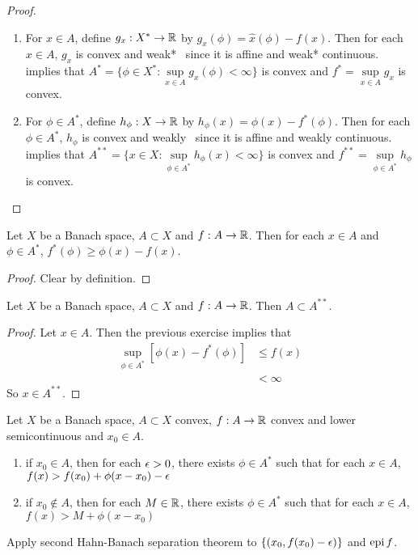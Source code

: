 \documentclass{book}
\begin{document}
	\begin{proof} \
		\begin{enumerate}
			\item For $x \in A$, define $g_x: X^* \rightarrow \mathbb{R}$ by $g_x(\phi) = \hat{x}(\phi) - f(x)$. Then for each $x \in A$, $g_x$ is convex and weak* \lsc \, since it is affine and weak* continuous.  implies that $A^* = \{\phi \in X^*: \sup\limits_{x \in A} g_x(\phi) < \infty \}$ is convex and  $f^* = \sup\limits_{x \in A} g_x$ is convex.
			\item For $\phi \in A^*$, define $h_{\phi}: X \rightarrow \mathbb{R}$ by $h_{\phi}(x) = \phi(x) - f^{*}(\phi)$. Then for each $\phi \in A^*$, $h_{\phi}$ is convex and weakly \lsc \, since it is affine and weakly continuous. \rex{91015} implies that $A^{**} = \{x \in X: \sup\limits_{\phi \in A^*} h_{\phi}(x) < \infty \}$ is convex and   $f^{**} = \sup\limits_{\phi \in A^*} h_{\phi}$ is convex. 
		\end{enumerate}		 
	\end{proof}
	
	\begin{ex} \lex{}
		Let $X$ be a Banach space, $A \subset X$ and $f:A \rightarrow \mathbb{R}$. Then for each $x \in A$ and $\phi \in A^*$, $f^*(\phi) \geq \phi(x) - f(x)$.	
	\end{ex}
	
	\begin{proof}
	Clear by definition.
	\end{proof}
	
	\begin{ex} \lex{}
	Let $X$ be a Banach space, $A \subset X$ and $f:A \rightarrow \mathbb{R}$. Then $A \subset A^{**}$.
	\end{ex}

	\begin{proof}
		Let $x \in A$. Then the previous exercise implies that
		\begin{align*}
			\sup_{\phi \in A^*} [\phi(x) - f^{*}(\phi)] 
			& \leq f(x) \\
			& < \infty  
		\end{align*}
		So $x \in A^{**}$.
	\end{proof}

	\begin{ex}
		Let $X$ be a Banach space, $A \subset X$ convex, $f:A \rightarrow \mathbb{R}$ convex and lower semicontinuous and $x_0 \in A$. 
		\begin{enumerate}
			\item if $x_0 \in A$, then for each $\epsilon >0$, there exists $\phi \in A^*$ such that for each $x \in A$, $f(x) > f(x_0) + \phi(x - x_0) - \epsilon$
			\item if $x_0 \not \in A$, then for each $M \in \mathbb{R}$, there exists $\phi \in A^*$ such that for each $x \in A$, $f(x) > M + \phi(x - x_0)$
		\end{enumerate}
	 Apply second Hahn-Banach separation theorem to $\{(x_0, f(x_0) - \epsilon)\}$ and $\operatorname{epi} f$.
	\end{ex}
\end{document}
